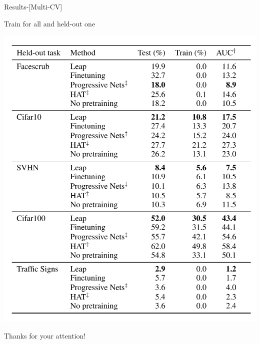 \documentclass[aspectratio=169]{beamer}
\begin{document}
\begin{frame}{Results-[Multi-CV]}
	\centering
	\begin{minipage}{0.5\textwidth}
		\color{Pink} Train for all and held-out one	
	\end{minipage}%
	\begin{minipage}{0.4\textwidth}
		\includegraphics[width=1.0\textwidth]{Figures/multicv}
	\end{minipage}

\end{frame}

\begin{frame}
	\centering
	\color{Pink} Thanks for your attention!
\end{frame}
\end{document}
